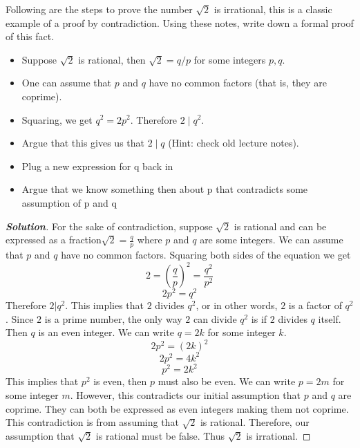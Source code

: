 \documentclass[11pt]{article}
\newenvironment{problem}[2][Problem\!]{\begin{trivlist}
\item[\hskip \labelsep {\bfseries #1}\hskip \labelsep {\bfseries #2.}]}{\end{trivlist}}
\newenvironment{solution}{\begin{proof}[\textbf{\textit{Solution}}]}{\end{proof}}
\begin{document}
\begin{problem}{5.2}Following are the steps to prove the number $\sqrt{2}$ is irrational, this is a classic example of a proof by contradiction. Using these notes, write down a formal proof of this fact.
\begin{itemize}
\item Suppose $\sqrt{2}$ is rational, then $\sqrt{2} = q/p$ for some integers $p,q$. 
\item One can assume that $p$ and $q$ have no common factors (that is, they are coprime).
\item Squaring, we get $q^2 = 2p^2$. Therefore $2\mid q^2$.
\item Argue that this gives us that $2\mid q$ (Hint: check old lecture notes).
\item Plug a new expression for q back in
\item Argue that we know something then about p that contradicts some assumption of p and q
\end{itemize}
\end{problem}
\begin{solution}\hfill %
For the sake of contradiction, suppose \(\sqrt{2}\) is rational and can be expressed as a fraction\(\sqrt{2} = \frac{q}{p} \) where \(p\) and \(q\) are some integers. We can assume that \(p\) and \(q\) have no common factors. Squaring both sides of the equation we get 
\[2 = (\frac{q}{p})^2 = \frac{q^2}{p^2}\]
\[2p^2 = q^2\]
Therefore \(2|q^2\). This implies that $2$ divides $q^2$, or in other words, $2$ is a factor of $q^2$. Since \(2\) is a prime number, the only way \(2\) can divide \(q^2\) is if \(2\) divides \(q\) itself. Then \(q\) is an even integer. We can write \(q = 2k\)  for some integer \(k\).
\[2p^2 = (2k)^2\]
\[2p^2 = 4k^2\]
\[p^2 = 2k^2\]
This implies that \(p^2\) is even, then \(p\) must also be even. We can write \(p = 2m\) for some integer \(m\). However, this contradicts our initial assumption that \(p\) and \(q\) are coprime. They can both be expressed as even integers making them not coprime. This contradiction is from assuming that \(\sqrt{2}\) is rational. Therefore, our assumption that \(\sqrt{2}\) is rational must be false. Thus \(\sqrt{2}\) is irrational.

\end{solution}

\newpage  %
\end{document}
